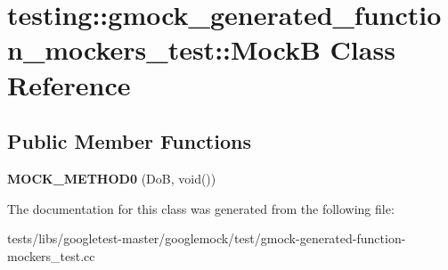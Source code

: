 \hypertarget{classtesting_1_1gmock__generated__function__mockers__test_1_1MockB}{}\section{testing\+:\+:gmock\+\_\+generated\+\_\+function\+\_\+mockers\+\_\+test\+:\+:MockB Class Reference}
\label{classtesting_1_1gmock__generated__function__mockers__test_1_1MockB}
\subsection*{Public Member Functions}
\begin{DoxyCompactItemize}
\item 
\mbox{\label{classtesting_1_1gmock__generated__function__mockers__test_1_1MockB_af0a5dcd462fc478e5e7a1ef503aafb05}} 
{\bfseries M\+O\+C\+K\+\_\+\+M\+E\+T\+H\+O\+D0} (DoB, void())
\end{DoxyCompactItemize}


The documentation for this class was generated from the following file\+:\begin{DoxyCompactItemize}
\item 
tests/libs/googletest-\/master/googlemock/test/gmock-\/generated-\/function-\/mockers\+\_\+test.\+cc\end{DoxyCompactItemize}
